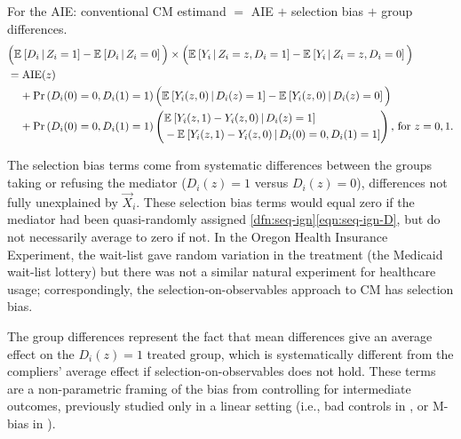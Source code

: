 \noindent
For the AIE: conventional CM estimand $=$ AIE $+$ selection bias $+$ group differences.
\begin{align*}
    &\Big( \mathbb{E}_{} \left[ D_i \, \middle\vert \, Z_i = 1 \right] - \mathbb{E}_{} \left[ D_i \, \middle\vert \, Z_i = 0 \right] \Big) \times
        \Big( \mathbb{E}_{} \left[ Y_i \, \middle\vert \, Z_i=z, D_i = 1 \right] - \mathbb{E}_{} \left[ Y_i \, \middle\vert \, Z_i=z, D_i = 0 \right] \Big) \\
    & = \text{AIE}(z) \\
    & \;\;\;\; + \Pr\left( D_i(0) = 0, D_i(1) = 1 \right) \Big(
        \mathbb{E}_{} \left[ Y_i(z, 0) \, \middle\vert \, D_i(z) = 1 \right] - \mathbb{E}_{} \left[ Y_i(z, 0) \, \middle\vert \, D_i(z) = 0 \right] \Big) \\
    & \;\;\;\; + \Pr\left( D_i(0) = 0, D_i(1) = 1 \right) 
        \left( \begin{aligned}
            &\mathbb{E}_{} \left[ Y_i(z, 1) - Y_i(z, 0) \, \middle\vert \, D_i(z)=1 \right]\\
            &- \mathbb{E}_{} \left[ Y_i(z, 1) - Y_i(z, 0) \, \middle\vert \, D_i(0)=0, D_i(1)=1 \right]
            \end{aligned} \right)
    \text{, for } z = 0,1.
\end{align*}

The selection bias terms come from systematic differences between the groups taking or refusing the mediator ($D_i(z) = 1$ versus $D_i(z) = 0$), differences not fully unexplained by $\vec X_i$.
These selection bias terms would equal zero if the mediator had been quasi-randomly assigned \ref{dfn:seq-ign}\eqref{eqn:seq-ign-D}, but do not necessarily average to zero if not.
In the Oregon Health Insurance Experiment, the wait-list gave random variation in the treatment (the Medicaid wait-list lottery) but there was not a similar natural experiment for healthcare usage; correspondingly, the selection-on-observables approach to CM has selection bias.

The group differences represent the fact that mean differences give an average effect on the $D_i(z) = 1$ treated group, which is systematically different from the compliers' average effect if selection-on-observables does not hold.
These terms are a non-parametric framing of the bias from controlling for intermediate outcomes, previously studied only in a linear setting (i.e., bad controls in \citealt{cinelli2024crash}, or M-bias in \citealt{ding2015adjust}).

